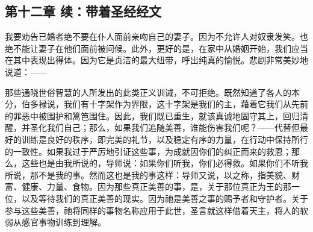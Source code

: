 
\subsection{第十二章 续：带着圣经经文}

我要劝告已婚者绝不要在仆人面前亲吻自己的妻子。因为不允许人对奴隶发笑。也绝不能让妻子在他们面前被问候。此外，更好的是，在家中从婚姻开始，我们应当在其中表现出得体。因为它是贞洁的最大纽带，呼出纯真的愉悦。悲剧非常美妙地说道：——\par

\par

那些通晓世俗智慧的人所发出的此类正义训诫，不可拒绝。既然知道了各人的本分，伯多禄说，我们有十字架作为界限，这十字架是我们的主，藉着它我们从先前的罪恶中被围护和篱笆围住。因此，我们既已重生，就该真诚地固守其上，回归清醒，并圣化我们自己；那么，如果我们追随美善，谁能伤害我们呢？——代替但最好的训练是良好的秩序，即完美的礼节，以及稳定有序的力量，在行动中保持所行的一致性。如果我过于严厉地引证这些事，为成就因你们的纠正而来的救恩；那么，这些也是由我所说的，导师说：如果你们听我，你们必得救。如果你们不听我所说，那不是我的事。然而这也是我的事这样：导师又说，以之称，指美貌、财富、健康、力量、食物。因为那些真正美善的事，是，关于那位真正为王的那一位，以及等待我们的真正美善的现实。因为祂是美善之事的赐予者和守护者。关于参与这些美善，祂将同样的事物名称应用于此世，圣言就这样借着天主，将人的软弱从感官事物训练到理解。\par

